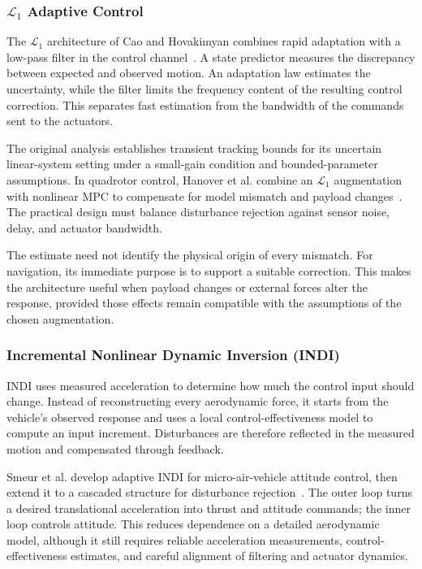 \FloatBarrier
\subsubsection{\texorpdfstring{$\mathcal L_1$}{L1} Adaptive Control}
The $\mathcal L_1$ architecture of Cao and Hovakimyan combines rapid adaptation with a low-pass filter in the control channel~\cite{litL1Original2006}. A state predictor measures the discrepancy between expected and observed motion. An adaptation law estimates the uncertainty, while the filter limits the frequency content of the resulting control correction. This separates fast estimation from the bandwidth of the commands sent to the actuators.

The original analysis establishes transient tracking bounds for its uncertain linear-system setting under a small-gain condition and bounded-parameter assumptions. In quadrotor control, Hanover et al. combine an $\mathcal L_1$ augmentation with nonlinear MPC to compensate for model mismatch and payload changes~\cite{litHanover2022}. The practical design must balance disturbance rejection against sensor noise, delay, and actuator bandwidth.

The estimate need not identify the physical origin of every mismatch. For navigation, its immediate purpose is to support a suitable correction. This makes the architecture useful when payload changes or external forces alter the response, provided those effects remain compatible with the assumptions of the chosen augmentation.

\FloatBarrier
\subsubsection{Incremental Nonlinear Dynamic Inversion (INDI)}
INDI uses measured acceleration to determine how much the control input should change. Instead of reconstructing every aerodynamic force, it starts from the vehicle's observed response and uses a local control-effectiveness model to compute an input increment. Disturbances are therefore reflected in the measured motion and compensated through feedback.

Smeur et al. develop adaptive INDI for micro-air-vehicle attitude control, then extend it to a cascaded structure for disturbance rejection~\cite{litINDI2016,litINDI2018}. The outer loop turns a desired translational acceleration into thrust and attitude commands; the inner loop controls attitude. This reduces dependence on a detailed aerodynamic model, although it still requires reliable acceleration measurements, control-effectiveness estimates, and careful alignment of filtering and actuator dynamics.

